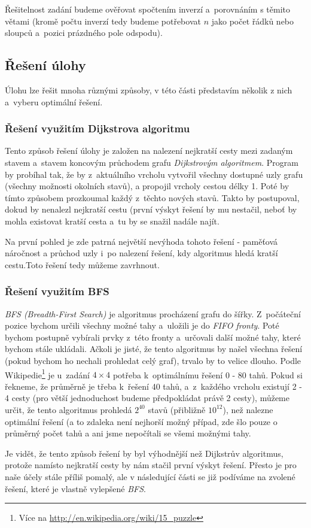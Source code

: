 \documentclass[12pt,titlepage]{article}
\begin{document}
Řešitelnost zadání budeme ověřovat spočtením inverzí a~porovnáním s těmito větami (kromě počtu inverzí tedy budeme potřebovat $n$ jako počet řádků nebo sloupců a~pozici prázdného pole odspodu).

\subsection{Řešení úlohy}
Úlohu lze řešit mnoha různými způsoby, v této části představím několik z nich a~vyberu optimální řešení.

\subsubsection{Řešení využitím Dijkstrova algoritmu}
Tento způsob řešení úlohy je založen na nalezení nejkratší cesty mezi zadaným stavem a~stavem koncovým průchodem grafu \textit{Dijkstrovým algoritmem}. Program by probíhal tak, že by z~aktuálního vrcholu vytvořil všechny dostupné uzly grafu (všechny možnosti okolních stavů), a propojil vrcholy cestou délky 1. Poté by tímto způsobem prozkoumal každý z~těchto nových stavů. Takto by postupoval, dokud by nenalezl nejkratší cestu (první výskyt řešení by mu nestačil, neboť by mohla existovat kratší cesta a~tu by se snažil nadále najít.
\par
Na první pohled je zde patrná největší nevýhoda tohoto řešení - paměťová náročnost a průchod uzly i~po nalezení řešení, kdy algoritmus hledá kratší cestu.Toto řešení tedy můžeme zavrhnout.

\subsubsection{Řešení využitím BFS}
\textit{BFS (Breadth-First Search)} je algoritmus procházení grafu do šířky. Z~počáteční pozice bychom určili všechny možné tahy a~uložili je do \textit{FIFO fronty}. Poté bychom postupně vybírali prvky z~této fronty a~určovali další možné tahy, které bychom stále ukládali. Ačkoli je jisté, že tento algoritmus by našel všechna řešení (pokud bychom ho nechali prohledat celý graf), trvalo by to velice dlouho. Podle Wikipedie\footnote{Více na \url{http://en.wikipedia.org/wiki/15_puzzle}} je u~zadání $4\times4$ potřeba k~optimálnímu řešení 0 - 80 tahů. Pokud si řekneme, že průměrně je třeba k~řešení 40 tahů, a~z~každého vrcholu existují 2 - 4 cesty (pro větší jednoduchost budeme předpokládat právě 2 cesty), můžeme určit, že tento algoritmus prohledá $2^{40}$ stavů (přibližně $10^{12}$), než nalezne optimální řešení (a to zdaleka není nejhorší možný případ, zde šlo pouze o průměrný počet tahů a ani jsme nepočítali se všemi možnými tahy.
\par
Je vidět, že tento způsob řešení by byl výhodnější než Dijkstrův algoritmus, protože namísto nejkratší cesty by nám stačil první výskyt řešení. Přesto je pro naše účely stále příliš pomalý, ale v následující části se již podíváme na zvolené řešení, které je vlastně vylepšené \textit{BFS}.
\end{document}
